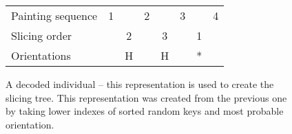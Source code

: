 \begin{figure}[htp]
    \begin{tabular}{lccccccc}
        Painting sequence & 1 &   & 2 &   & 3 &   & 4 \\
        Slicing order     &   & 2 &   & 3 &   & 1 &   \\
        Orientations      &   & H &   & H &   & * &
    \end{tabular}
    \caption{A decoded individual – this representation is used to create the slicing tree. This representation was created from the previous one by taking lower indexes of sorted random keys and most probable orientation.}
    \label{tab:ind-decoded}

\end{figure}


